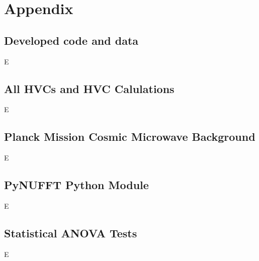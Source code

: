 \setcounter{chapter}{7}
\setcounter{section}{0}

\renewcommand*{\thechapter}{}

\appendix

\chapter{Appendix}
\label{cha:appendix}

\renewcommand*{\thesection}{\Alph{section}}

\section{Developed code and data}
\label{sec:appendixA}

E

\section{All HVCs and HVC Calulations}
\label{sec:appendixB}

E

\section{Planck Mission Cosmic Microwave Background}
\label{sec:appendixC}

E

\section{PyNUFFT Python Module}
\label{sec:appendixD}

E

\section{Statistical ANOVA Tests}
\label{sec:appendixE}

E